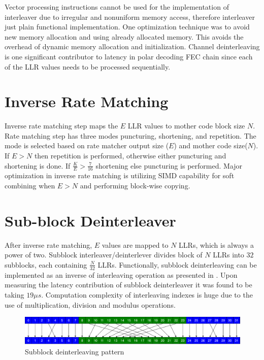 Vector processing instructions cannot be used for the implementation of interleaver due to irregular and nonuniform memory access, therefore interleaver just plain functional implementation. One optimization technique was to avoid new memory allocation and using already allocated memory. This avoids the overhead of dynamic memory allocation and initialization. Channel deinterleaving is one significant contributor to latency in polar decoding FEC chain since each of the LLR values needs to be processed sequentially.

\section{Inverse Rate Matching}
Inverse rate matching step maps the $E$ LLR values to mother code block size $ N $. Rate matching step has three modes puncturing, shortening, and repetition. The mode is selected based on rate matcher output size ($E$) and mother code size($ N $). If $E > N$ then repetition is performed, otherwise either puncturing and shortening is done. If $ \frac{K}{E} > \frac{7}{16} $ shortening else puncturing is performed. Major optimization in inverse rate matching is utilizing SIMD capability for soft combining when $ E>N $ and performing block-wise copying.
%
%
\section{Sub-block Deinterleaver}
After inverse rate matching, $E$ values are mapped to $N$ LLRs, which is always a power of two. Subblock interleaver/deinterlever divides block of $N$ LLRs into $32$ subblocks, each containing $\frac{N}{32}$ LLRs. Functionally, subblock deinterleaving can be implemented as an inverse of interleaving operation as presented in \cite{3gpp.38.212}. Upon measuring the latency contribution of subblock deinterleaver it was found to be taking $19 \mu s$. Computation complexity of interleaving indexes is huge due to the use of multiplication, division and modulus operations. \newline

\begin{figure}[]
	\centering
	\includegraphics[width=1.0\textwidth]{./figures/subblockDeinterleaver.pdf}
	\caption{Subblock deinterleaving pattern}
	\label{fig:subblockDeinterleaver}
\end{figure}

